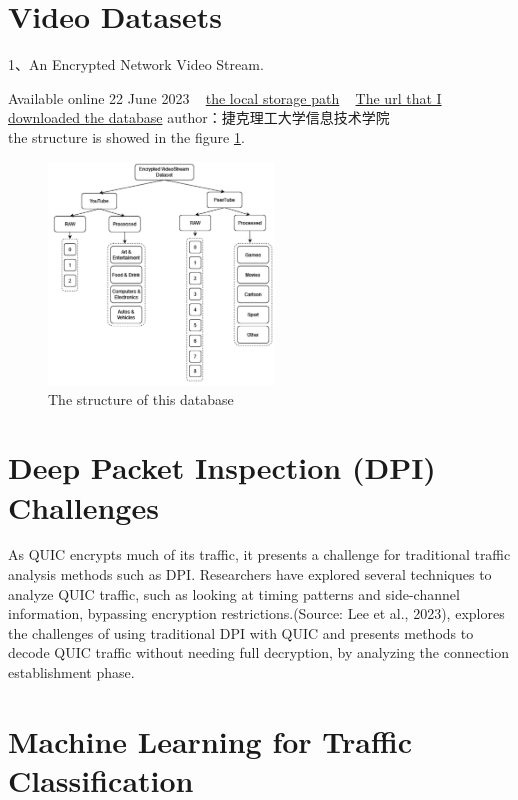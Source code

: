 \documentclass[a4paper, 10pt]{article}
\begin{document}
\begin{CJK}{UTF8}{gbsn}
	
	\section{Video Datasets}
	
	1、An Encrypted Network Video Stream. 
	
	Available online 22 June 2023 	~	
	 \href{file://media/kl/7c5ed3c9-49bd-46de-bbdd-976fbc893c6d/database/envsds}{the local storage path} ~
	\href{https://zenodo.org/records/8039729/files/envsds.zip?download=1}{The url that I downloaded the database} 	
	author：捷克理工大学信息技术学院\\
	the structure is showed in the figure \ref{fig:database1}.
	
	\begin{figure}[h]
	\centering
	\includegraphics[width=6cm]{database1.jpg}
	\caption{The structure of this database}
	\label{fig:database1}
	\end{figure}
	
	
	
	
	
	
	
	
	\section{Deep Packet Inspection (DPI) Challenges} 
	
	As QUIC encrypts much of its traffic, it presents a challenge for traditional traffic analysis methods such as DPI. Researchers have explored several techniques to analyze QUIC traffic, such as looking at timing patterns and side-channel information, bypassing encryption restrictions.(Source: Lee et al., 2023), explores the challenges of using traditional DPI with QUIC and presents methods to decode QUIC traffic without needing full decryption, by analyzing the connection establishment phase.
	\section{Machine Learning for Traffic Classification} 	
	

\end{CJK}
\end{document}
